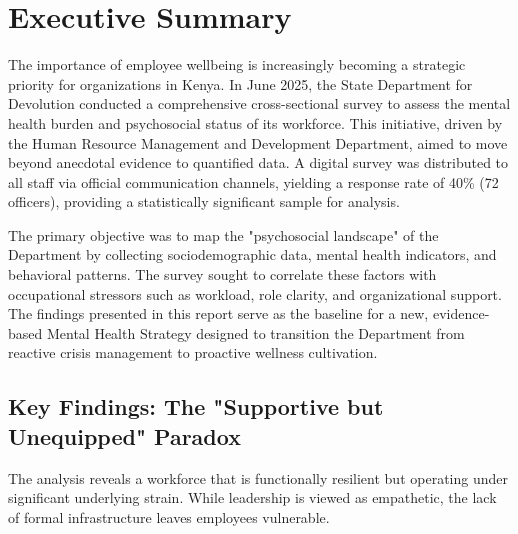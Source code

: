 \chapter*{Executive Summary}
\noindent The importance of employee wellbeing is increasingly becoming a strategic priority for organizations in Kenya. In June 2025, the State Department for Devolution conducted a comprehensive cross-sectional survey to assess the mental health burden and psychosocial status of its workforce. This initiative, driven by the Human Resource Management and Development Department, aimed to move beyond anecdotal evidence to quantified data. A digital survey was distributed to all staff via official communication channels, yielding a response rate of 40\% (72 officers), providing a statistically significant sample for analysis.

\vspace{0.3cm}
\noindent The primary objective was to map the "psychosocial landscape" of the Department by collecting sociodemographic data, mental health indicators, and behavioral patterns. The survey sought to correlate these factors with occupational stressors such as workload, role clarity, and organizational support. The findings presented in this report serve as the baseline for a new, evidence-based Mental Health Strategy designed to transition the Department from reactive crisis management to proactive wellness cultivation.

\vspace{0.5cm}
\section*{Key Findings: The "Supportive but Unequipped" Paradox}
\noindent The analysis reveals a workforce that is functionally resilient but operating under significant underlying strain. While leadership is viewed as empathetic, the lack of formal infrastructure leaves employees vulnerable.

